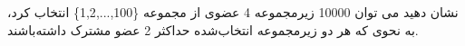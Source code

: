     نشان دهید می توان 10000 زیرمجموعه 4 عضوی از مجموعه \{100,...,1,2\} انتخاب کرد، به نحوی که هر دو    زیرمجموعه انتخاب‌شده حداکثر 2 عضو مشترک داشته‌باشند.